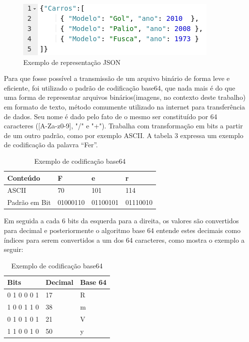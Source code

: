 \documentclass[12pt]{article}
\begin{document}
\begin{figure}[ht]
	\centering
	\includegraphics[width=.7\textwidth]{exemplo-json.png}
	\caption{Exemplo de representação JSON}
	\label{fig:Figura4}
\end{figure}

Para que fosse possível a transmissão de um arquivo binário de forma leve e eficiente, foi utilizado o padrão de codificação base64, que nada mais é do que uma forma de representar arquivos binários(imagens, no contexto deste trabalho) em formato de texto, método comumente utilizado na internet para transferência de dados.
Seu nome é dado pelo fato de o mesmo ser constituído por 64 caracteres ([A-Za-z0-9], "/" e "+"). Trabalha com transformação em bits a partir de um outro padrão, como por exemplo ASCII. A tabela 3 expressa um exemplo de codificação da palavra “Fer”.

\begin{table}[ht]
	\centering
	\caption{Exemplo de codificação base64}
	\label{tab:Table3}
	\smallskip
	\begin{tabular}{ |l|l|l|l| }
		\hline
		Conteúdo & F & e & r \\ \hline
		ASCII & 70 & 101 & 114 \\ \hline
		Padrão em Bit & 01000110 & 01100101 & 01110010\\ \hline
	\end{tabular}
\end{table}

Em seguida a cada 6 bits da esquerda para a direita, os valores são convertidos para decimal e posteriormente o algoritmo base 64 entende estes decimais como índices para serem convertidos a um dos 64 caracteres, como mostra o exemplo a seguir:

\begin{table}[ht]
	\centering
	\caption{Exemplo de codificação base64}
	\label{tab:Table4}
	\smallskip
	\begin{tabular}{ |l|l|l| }
		\hline
		Bits & Decimal & Base 64\\ \hline
		0 1 0 0 0 1 & 17 & R \\ \hline
		1 0 0 1 1 0 & 38 & m \\ \hline
		0 1 0 1 0 1 & 21 & V \\ \hline
		1 1 0 0 1 0 & 50 & y \\ \hline
	\end{tabular}
\end{table}
\end{document}

